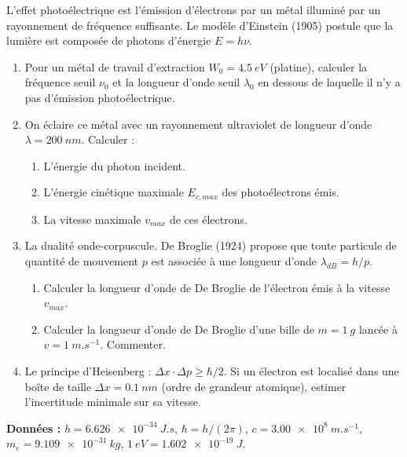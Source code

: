 \documentclass[12pt,a4paper]{article}
\begin{document}
\begin{boiteexercice}
L'effet photoélectrique est l'émission d'électrons par un métal illuminé par un rayonnement de fréquence suffisante. Le modèle d'Einstein (1905) postule que la lumière est composée de photons d'énergie $E = h\nu$.

\begin{enumerate}
  \item Pour un métal de travail d'extraction $W_0 = \qty{4.5}{eV}$ (platine), calculer la fréquence seuil $\nu_0$ et la longueur d'onde seuil $\lambda_0$ en dessous de laquelle il n'y a pas d'émission photoélectrique.

  \item On éclaire ce métal avec un rayonnement ultraviolet de longueur d'onde $\lambda = \qty{200}{nm}$. Calculer :
  \begin{enumerate}[label=(\alph*)]
    \item L'énergie du photon incident.
    \item L'énergie cinétique maximale $E_{c,max}$ des photoélectrons émis.
    \item La vitesse maximale $v_{max}$ de ces électrons.
  \end{enumerate}

  \item La dualité onde-corpuscule. De Broglie (1924) propose que toute particule de quantité de mouvement $p$ est associée à une longueur d'onde $\lambda_{dB} = h/p$.
  \begin{enumerate}[label=(\alph*)]
    \item Calculer la longueur d'onde de De Broglie de l'électron émis à la vitesse $v_{max}$.
    \item Calculer la longueur d'onde de De Broglie d'une bille de $m = \qty{1}{g}$ lancée à $v = \qty{1}{m.s^{-1}}$. Commenter.
  \end{enumerate}

  \item Le principe d'Heisenberg : $\Delta x\cdot\Delta p \geq \hbar/2$. Si un électron est localisé dans une boîte de taille $\Delta x = \qty{0.1}{nm}$ (ordre de grandeur atomique), estimer l'incertitude minimale sur sa vitesse.
\end{enumerate}

\textbf{Données :} $h = \qty{6.626e-34}{J.s}$, $\hbar = h/(2\pi)$, $c = \qty{3.00e8}{m.s^{-1}}$, $m_e = \qty{9.109e-31}{kg}$, $\qty{1}{eV} = \qty{1.602e-19}{J}$.
\end{boiteexercice}
\end{document}
